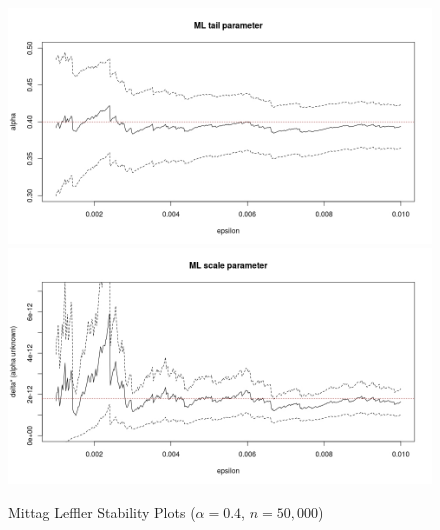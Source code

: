 \documentclass[honours,12pt]{unswthesis}
\newcommand{\1}{\mathbf 1}
\numberwithin{equation}{section}
\theoremstyle{definition}
\theoremstyle{remark}
\begin{document}


\begin{figure}[h]
    \centering
    \includegraphics[width=\textwidth]{Figures/MLtail01}
    \includegraphics[width=\textwidth]{Figures/MLscale01}
    \caption{Mittag Leffler Stability Plots ($\alpha=0.4$, $n=50,000$)}\label{fig:MLstability}
\end{figure}
\end{document}
